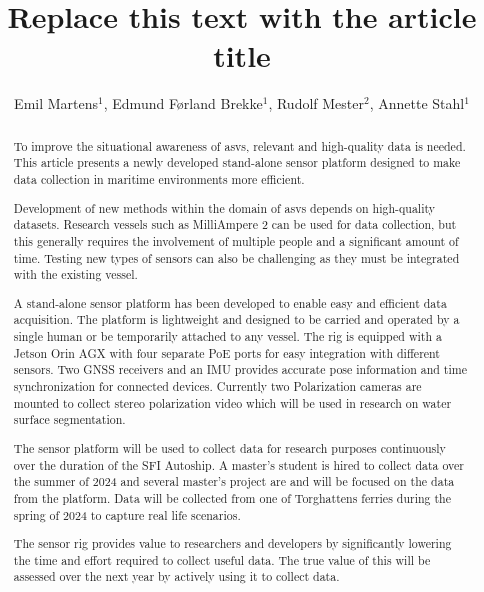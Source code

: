 \documentclass{iopconfser}
\begin{document}
\title{Replace this text with the article title}

\author{Emil Martens$^{1}$, Edmund Førland Brekke$^{1}$, Rudolf Mester$^{2}$, Annette Stahl$^{1}$}



\begin{abstract}

    To improve the situational awareness of \glspl{asv}, relevant and high-quality data is needed.
    This article presents a newly developed stand-alone sensor platform designed to make data collection in maritime environments more efficient.
    
    
    
    Development of new methods within the domain of \glspl{asv} depends on high-quality datasets. 
    Research vessels such as MilliAmpere 2 can be used for data collection, but this generally requires the involvement of multiple people and a significant amount of time. 
    Testing new types of sensors can also be challenging as they must be integrated with the existing vessel.
    
    A stand-alone sensor platform has been developed to enable easy and efficient data acquisition. 
    The platform is lightweight and designed to be carried and operated by a single human or be temporarily attached to any vessel. 
    The rig is equipped with a Jetson Orin AGX with four separate PoE ports for easy integration with different sensors. 
    Two GNSS receivers and an IMU provides accurate pose information and time synchronization for connected devices. 
    Currently two Polarization cameras are mounted to collect stereo polarization video which will be used in research on water surface segmentation.
    
    
    The sensor platform will be used to collect data for research purposes continuously over the duration of the SFI Autoship. 
    A master's student is hired to collect data over the summer of 2024 and several master's project are and will be focused on the data from the platform. 
    Data will be collected from one of Torghattens ferries during the spring of 2024 to capture real life scenarios.
    
    
    The sensor rig provides value to researchers and developers by significantly lowering the time and effort required to collect useful data. 
    The true value of this will be assessed over the next year by actively using it to collect data.
    
\end{abstract}
\end{document}
